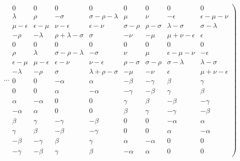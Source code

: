 \documentclass[12pt]{article}
\begin{document}
\begin{displaymath}
\cdots \left.
\begin{array}{cccccccc}
0 &  0 &  0  &   0 &  0 &  0 &   0 &   0 \\
\lambda &  \rho & -\sigma  &\sigma-\rho-\lambda&  \mu &  \nu &  -\epsilon & \epsilon-\mu-\nu \\
\mu-\epsilon &\epsilon-\mu & \nu-\epsilon & \epsilon-\nu &\sigma-\rho &\rho-\sigma & \lambda-\sigma &  \sigma-\lambda \\
-\rho & -\lambda &\rho+\lambda-\sigma&   \sigma & -\nu & -\mu &\mu+\nu-\epsilon&   \epsilon \\
0 &  0 &  0  &   0 &  0 &  0 &   0 &   0 \\
\rho &  \lambda &\sigma-\rho-\lambda&  -\sigma &  \nu &  \mu &\epsilon-\mu-\nu&  -\epsilon \\
\epsilon-\mu &\mu-\epsilon & \epsilon-\nu & \nu-\epsilon &\rho-\sigma &\sigma-\rho & \sigma-\lambda &  \lambda-\sigma \\
-\lambda & -\rho &  \sigma  &\lambda+\rho-\sigma& -\mu & -\nu &   \epsilon & \mu+\nu-\epsilon \\
0 &  0 & -\alpha  &   \alpha & -\beta & -\gamma &   \beta &   \gamma \\
0 &  0 &  \alpha  & - \alpha & -\gamma & -\beta &   \gamma &   \beta \\
\alpha & -\alpha &  0  &   0 &  \gamma &  \beta &  -\beta &  -\gamma \\
-\alpha &  \alpha &  0  &   0 &  \beta &  \gamma &  -\gamma &  -\beta \\
\beta &  \gamma & -\gamma  &  -\beta &  0 &  0 &  -\alpha &   \alpha \\
\gamma &  \beta & -\beta  &  -\gamma &  0 &  0 &   \alpha &  -\alpha \\
-\beta & -\gamma &  \beta  &   \gamma &  \alpha & -\alpha &   0 &   0 \\
-\gamma & -\beta &  \gamma  &   \beta & -\alpha &  \alpha &   0 &   0
\end{array} \right)
\end{displaymath}
\end{document}
